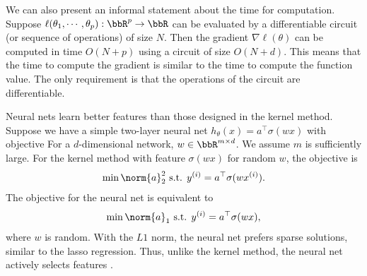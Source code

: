 We can also present an informal statement about the time for computation. Suppose $\ell(\theta_1, \cdots, \theta_p): \bbR^p \to \bbR$ can be evaluated by a differentiable circuit (or sequence of operations) of size $N$. Then the gradient $\nabla \ell(\theta)$ can be computed in time $O(N+p)$ using a circuit of size $O(N+d)$. This means that the time to compute the gradient is similar to the time to compute the function value. The only requirement is that the operations of the circuit are differentiable.

Neural nets learn better features than those designed in the kernel method. Suppose we have a simple two-layer neural net $h_\theta(x)=a^\top \sigma(wx)$ with objective
For a $d$-dimensional network, $w \in \bbR^{m \times d}$. We assume $m$ is sufficiently large. For the kernel method with feature $\sigma(wx)$ for random $w$, the objective is
\[
\min \norm{a}_2^2 \text{ s.t. } y^{(i)} = a^\top \sigma(wx^{(i)}).
\]
The objective for the neural net is equivalent to
\[
\min \norm{a}_1 \text{ s.t. } y^{(i)} = a^\top \sigma(wx),
\]
where $w$ is random. With the $L1$ norm, the neural net prefers sparse solutions, similar to the lasso regression. Thus, unlike the kernel method, the neural net actively selects features \cite{wei2020regularization}. 

